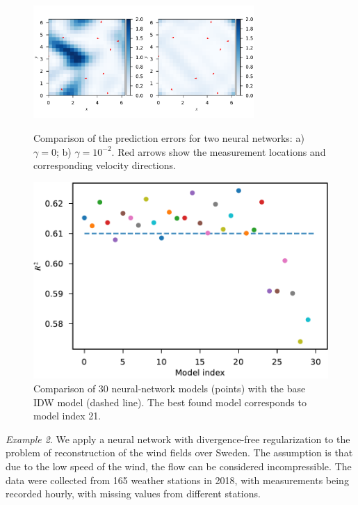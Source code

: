 \documentclass[pamm,a4paper,fleqn]{w-art}
\begin{document}
\begin{figure}
\begin{minipage}{0.48\textwidth}
  \includegraphics[width=3.3in]{assets/error-fields-comparison.pdf}
  \caption{Comparison of the prediction errors for two neural networks:
    a) $\gamma=0$; b) $\gamma=10^{-2}$.
    Red arrows show the measurement locations and corresponding
  velocity directions.}%
  \label{fig:tg2d}
\end{minipage}
\hfill
\begin{minipage}{0.48\textwidth}
  \centering
  \includegraphics[scale=0.42]{assets/r2-vs-model.pdf}
  \caption{Comparison of 30 neural-network models (points)
    with the base IDW model (dashed line).
  The best found model corresponds to model index 21.}%
  \label{fig:r2-vs-model}
\end{minipage}
\end{figure}

\emph{Example 2}.
We apply a neural network with divergence-free regularization to the problem of
reconstruction of the wind fields over Sweden.
The assumption is that due to the low speed of the wind, the flow can be
considered incompressible.
The data were collected from 165 weather stations in 2018, with measurements
being recorded hourly, with missing values from different stations.
\end{document}
